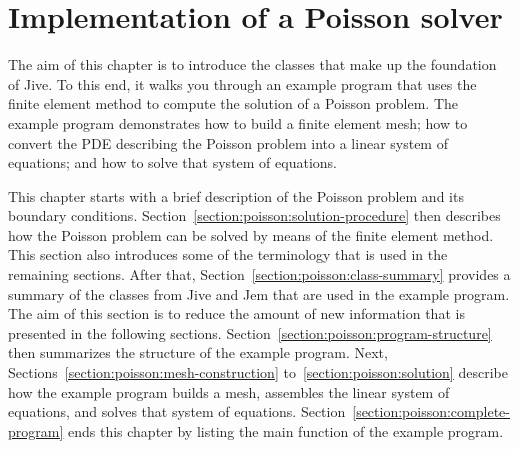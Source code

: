 
\chapter{Implementation of a Poisson solver}
\label{chapter:poisson}

The aim of this chapter is to introduce the classes that make up the
foundation of Jive. To this end, it walks you through an example
program that uses the finite element method to compute the solution of
a Poisson problem. The example program demonstrates how to build a
finite element mesh; how to convert the PDE describing the Poisson
problem into a linear system of equations; and how to solve that
system of equations.

\BlankLine
This chapter starts with a brief description of the Poisson problem
and its boundary conditions.
Section~\ref{section:poisson:solution-procedure} then describes
how the Poisson problem can be solved by means of the finite element
method. This section also introduces some of the terminology that is
used in the remaining sections.  After that,
Section~\ref{section:poisson:class-summary} provides a summary
of the classes from Jive and Jem that are used in the example program.
The aim of this section is to reduce the amount of new information
that is presented in the following sections.
Section~\ref{section:poisson:program-structure} then summarizes
the structure of the example program. Next,
Sections~\ref{section:poisson:mesh-construction}
to~\ref{section:poisson:solution} describe how the example
program builds a mesh, assembles the linear system of equations, and
solves that system of equations.
Section~\ref{section:poisson:complete-program} ends this
chapter by listing the main function of the example program.

